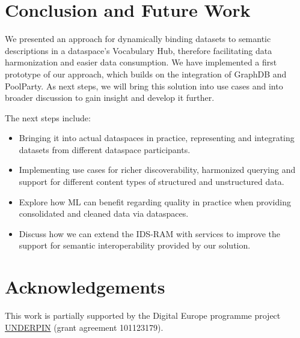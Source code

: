 \documentclass[
  super,
  preprint,
  3p]{elsarticle}
\providecommand{\tightlist}{%
  \setlength{\itemsep}{0pt}\setlength{\parskip}{0pt}}\usepackage{longtable,booktabs,array}
\begin{document}
\section{Conclusion and Future Work}\label{conclusion-and-future-work}

We presented an approach for dynamically binding datasets to semantic
descriptions in a dataspace's Vocabulary Hub, therefore facilitating
data harmonization and easier data consumption. We have implemented a
first prototype of our approach, which builds on the integration of
GraphDB and PoolParty. As next steps, we will bring this solution into
use cases and into broader discussion to gain insight and develop it
further.

The next steps include:

\begin{itemize}
\tightlist
\item
  Bringing it into actual dataspaces in practice, representing and
  integrating datasets from different dataspace participants.
\item
  Implementing use cases for richer discoverability, harmonized querying
  and support for different content types of structured and unstructured
  data.
\item
  Explore how ML can benefit regarding quality in practice when
  providing consolidated and cleaned data via dataspaces.
\item
  Discuss how we can extend the IDS-RAM with services to improve the
  support for semantic interoperability provided by our solution.
\end{itemize}

\section{Acknowledgements}\label{acknowledgements}

This work is partially supported by the Digital Europe programme project
\href{https://underpinproject.eu/}{UNDERPIN} (grant agreement
101123179).


\renewcommand\refname{References}
  
\end{document}

